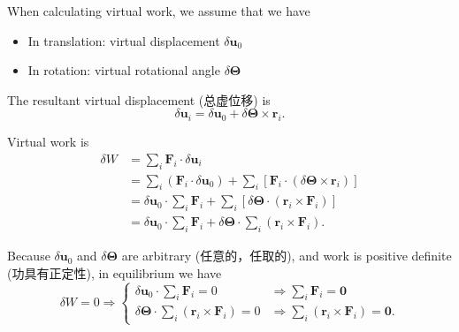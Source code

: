 When calculating virtual work, we assume that we have 

\begin{itemize}
\tightlist{}
\item In translation: virtual displacement \(\delta \boldsymbol u_0\)
\item In rotation: virtual rotational angle \(\delta \boldsymbol \Theta\)
\end{itemize}

The resultant virtual displacement (总虚位移) is
\[\delta \boldsymbol u_i = \delta \boldsymbol u_0 + \delta \boldsymbol \Theta \times \boldsymbol r_i.\]

Virtual work is \begin{align*}
    \delta W & = \sum_i \boldsymbol F_i \cdot \delta \boldsymbol u_i \\
    & = \sum_i \left( \boldsymbol F_i \cdot \delta \boldsymbol u_0 \right) + \sum_i \left[ \boldsymbol F_i \cdot \left (\delta \boldsymbol \Theta \times \boldsymbol r_i \right) \right] \\
    & = \delta \boldsymbol u_0 \cdot \sum_i \boldsymbol F_i + \sum_i \left[ \delta \boldsymbol \Theta \cdot \left (\boldsymbol r_i \times \boldsymbol F_i \right) \right] \\
    & = \delta \boldsymbol u_0 \cdot \sum_i \boldsymbol F_i + \delta \boldsymbol \Theta \cdot \sum_i \left (\boldsymbol r_i \times \boldsymbol F_i \right).
\end{align*}

Because \(\delta \boldsymbol u_0\) and \(\delta \boldsymbol \Theta\) are
arbitrary (任意的，任取的), and work is positive definite
(功具有正定性), in equilibrium we have
\[\delta W = 0 \Rightarrow \left\{
    \begin{array}{ll}
        \delta \boldsymbol u_0 \cdot \sum_i \boldsymbol F_i = 0 & \Rightarrow  \sum_i \boldsymbol F_i = \boldsymbol 0
        \\[1.5ex]
        \delta \boldsymbol \Theta \cdot \sum_i \left (\boldsymbol r_i \times \boldsymbol F_i \right) = 0 & \Rightarrow  \sum_i \left (\boldsymbol r_i \times \boldsymbol F_i \right) = \boldsymbol 0.
    \end{array}
\right.\]
